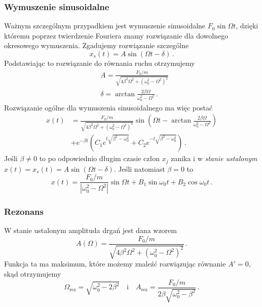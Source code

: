 \documentclass[../main.tex]{subfiles}
\begin{document}
    \subsubsection*{Wymuszenie sinusoidalne}
    Ważnym szczególnym przypadkiem jest wymuszenie sinusoidalne \(F_0\sin\Omega t\), dzięki któremu
    poprzez twierdzenie Fouriera znamy rozwiązanie dla dowolnego okresowego wymuszenia. Zgadujemy
    rozwiązanie szczególne
    \begin{equation*}
        x_s(t)=A\sin(\Omega t-\delta)\,.
    \end{equation*}
    Podstawiając to rozwiązanie do równania ruchu otrzymujemy
    \begin{equation*}
    \begin{split}
        &A=\frac{F_0/m}{\sqrt{4\beta^2\Omega^2+(\omega_0^2-\Omega^2)^2}}\\
        &\delta=\arctan\frac{2\beta\Omega}{\omega_0^2-\Omega^2}\,.
    \end{split}
    \end{equation*}
    Rozwiązanie ogólne dla wymuszenia sinusoidalnego ma więc postać
    \begin{equation*}
    \begin{split}
        x(t)&=\frac{F_0/m}{\sqrt{4\beta^2\Omega^2+(\omega_0^2-\Omega^2)^2}}\sin\left(\Omega t-\arctan\frac{2\beta\Omega}{\omega_0^2-\Omega^2}\right)\\
        &+e^{-\beta t}\left(C_1e^{t\sqrt{\beta^2-\omega_0^2}}+C_2e^{-t\sqrt{\beta^2-\omega_0^2}}\right)\,.
    \end{split}
    \end{equation*}
    Jeśli \(\beta\neq0\) to po odpowiednio długim czasie człon \(x_j\) zanika i w \textit{stanie
    ustalonym} \(x(t)=x_s(t)=A\sin(\Omega t-\delta)\). Jeśli natomiast \(\beta=0\) to
    \begin{equation*}
        x(t)=\frac{F_0/m}{|\omega_0^2-\Omega^2|}\sin\Omega t+B_1\sin\omega_0t+B_2\cos\omega_0t\,.
    \end{equation*}
    \subsubsection{Rezonans}
    W stanie ustalonym amplituda drgań jest dana wzorem
    \begin{equation*}
        A(\Omega)=\frac{F_0/m}{\sqrt{4\beta^2\Omega^2+(\omega_0^2-\Omega^2)^2}}\,.
    \end{equation*}
    Funkcja ta ma maksimum, które możemy znaleźć rozwiązując równanie \(A'=0\), skąd otrzymujemy
    \begin{equation*}
        \Omega_\text{rez}=\sqrt{\omega_0^2-2\beta^2}\quad\text{i}\quad A_\text{rez}=\frac{F_0/m}{2\beta\sqrt{\omega_0^2-\beta^2}}\,.
    \end{equation*}
\end{document}
